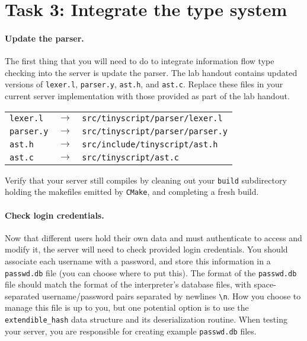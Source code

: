 \documentclass[11pt]{article}
\begin{document}
{\newpage
\section{Task 3: Integrate the type system}
\label{sec:integrate}

\paragraph{Update the parser.} The first thing that you will need to do to integrate information flow type 
checking into the server is update the parser. The lab handout contains updated versions of {\color{red}\verb'lexer.l'}, 
{\color{red}\verb'parser.y'}, {\color{red}\verb'ast.h'}, and {\color{red}\verb'ast.c'}. Replace these files in your 
current server implementation with those provided as part of the lab handout.
\begin{center}
\begin{tabular}{lcl}
{\color{red}\verb'lexer.l'} & $\longrightarrow$ & \verb'src/tinyscript/parser/lexer.l' \\
{\color{red}\verb'parser.y'} & $\longrightarrow$ & \verb'src/tinyscript/parser/parser.y' \\
{\color{red}\verb'ast.h'} & $\longrightarrow$ & \verb'src/include/tinyscript/ast.h' \\
{\color{red}\verb'ast.c'} & $\longrightarrow$ & \verb'src/tinyscript/ast.c'
\end{tabular}
\end{center}
Verify that your server still compiles by cleaning out your \verb'build' subdirectory holding the makefiles emitted 
by \verb'CMake', and completing a fresh build.

\paragraph{Check login credentials.} Now that different users hold their own data and must authenticate to access 
and modify it, the server will need to check provided login credentials. You should associate each username with a
 password, and store this information in a \verb'passwd.db' file (you can choose where to put this). The format 
 of the \verb'passwd.db' file should match the format of the interpreter's database files, with space-separated 
 username/password pairs separated by newlines \verb'\n'. How you choose to manage this file is up to you, but one
  potential option is to use the \verb'extendible_hash' data structure and its deserialization routine. 
  When testing your server, you are responsible for creating example \verb'passwd.db' files.

}
\end{document}

